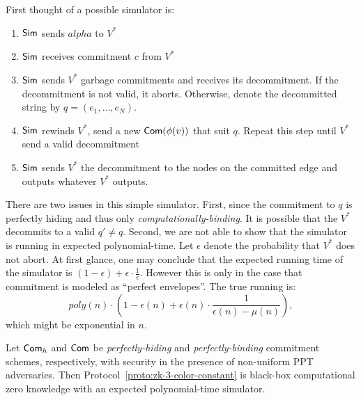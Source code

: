 \\ \\
First thought of a possible simulator is:
\begin{enumerate}
\item ${\sf Sim}$ sends $alpha$ to $V^*$
\item ${\sf Sim}$ receives commitment $c$ from $V^*$
\item ${\sf Sim}$ sends $V^*$ garbage commitments and receives its decommitment. If the decommitment is not valid, it aborts. Otherwise, denote the decommitted string by 
$q=(e_1,\ldots,e_N)$.
\item ${\sf Sim}$ rewinds $V^*$, send a new ${\sf Com}(\phi(v))$ that suit $q$. Repeat this step until $V^*$ send a valid decommitment
\item ${\sf Sim}$ sends $V^*$ the decommitment to the nodes on the committed edge and outputs whatever $V^*$ outputs.
\end{enumerate}
There are two issues in this simple simulator. First, since the commitment to $q$ is perfectly hiding and thus only {\it computationally-binding}. It is possible that the $V^*$ decommits to a valid $q'\neq q$. Second, we are not able to show that the simulator is running in expected polynomial-time. Let $\epsilon$ denote the probability that $V^*$ does not abort. At first glance, one may conclude that the expected running time of the simulator is $(1-\epsilon)+\epsilon\cdot\frac{1}{\epsilon}$. However this is only in the case that commitment is modeled as ``perfect envelopes''. The true running is:
$$poly(n)\cdot(1-\epsilon(n)+\epsilon(n)\cdot\frac{1}{\epsilon(n)-\mu(n)}),$$
which might be exponential in $n$.
\begin{theorem} Let ${\sf Com}_h$ and ${\sf Com}$ be {\it perfectly-hiding} and {\it perfectly-binding} commitment schemes, respectively, with security in the presence of non-uniform PPT adversaries. Then Protocol~\ref{proto:zk-3-color-constant} is black-box computational zero knowledge with an expected polynomial-time simulator.
\end{theorem}
